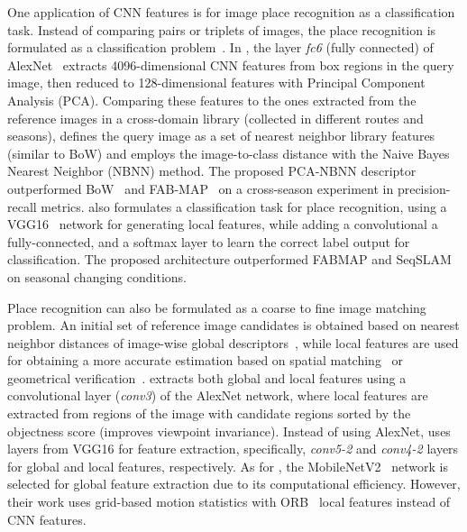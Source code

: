 One application of CNN features is for image place recognition as a classification task. Instead of comparing pairs or triplets of images, the place recognition is formulated as a classification problem~\parencite{chen-et-al:2018:2859916}.
In \cite{taisho-kanji:2016:7866383}, the layer \textit{fc6} (fully connected) of AlexNet~\parencite{original:alexnet} extracts 4096-dimensional CNN features from box regions in the query image, then reduced to 128-dimensional features with Principal Component Analysis (PCA). Comparing these features to the ones extracted from the reference images in a cross-domain library (collected in different routes and seasons), \cite{taisho-kanji:2016:7866383} defines the query image as a set of nearest neighbor library features (similar to BoW) and employs the image-to-class distance with the Naive Bayes Nearest Neighbor (NBNN) method. The proposed PCA-NBNN descriptor outperformed BoW~\parencite{discussion:bow} and FAB-MAP~\parencite{discussion:fab-map} on a cross-season experiment in precision-recall metrics.
\cite{chen-et-al:2018:2859916} also formulates a classification task for place recognition, using a VGG16~\parencite{original:vgg} network for generating local features, while adding a convolutional a fully-connected, and a softmax layer to learn the correct label output for classification. The proposed architecture outperformed FABMAP and SeqSLAM~\parencite{discussion:seqslam} on seasonal changing conditions.

Place recognition can also be formulated as a coarse to fine image matching problem. An initial set of reference image candidates is obtained based on nearest neighbor distances of image-wise global descriptors~\parencite{xin-et-al:2017:8310121,camara-et-al:2020:9196967,liu-et-al:2021:9561126}, while local features are used for obtaining a more accurate estimation based on spatial matching~\parencite{xin-et-al:2017:8310121,camara-et-al:2020:9196967} or geometrical verification~\parencite{liu-et-al:2021:9561126}.
\cite{xin-et-al:2017:8310121} extracts both global and local features using a convolutional layer (\textit{conv3}) of the AlexNet network, where local features are extracted from regions of the image with candidate regions sorted by the objectness score (improves viewpoint invariance).
Instead of using AlexNet, \cite{camara-et-al:2020:9196967} uses layers from VGG16 for feature extraction, specifically, \textit{conv5-2} and \textit{conv4-2} layers for global and local features, respectively.
As for \cite{liu-et-al:2021:9561126}, the MobileNetV2~\parencite{original:mobilenetv2} network is selected for global feature extraction due to its computational efficiency. However, their work uses grid-based motion statistics with ORB~\parencite{original:orb} local features instead of CNN features.

